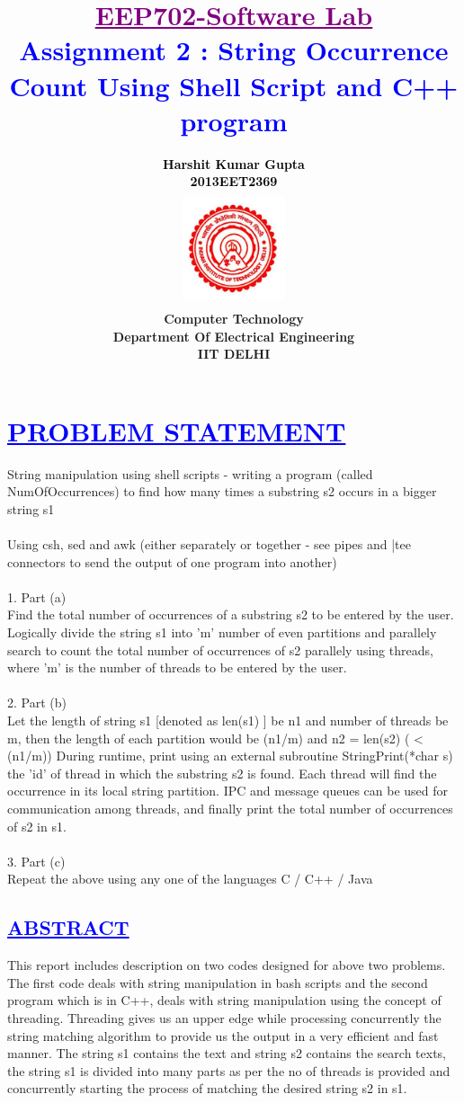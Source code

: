 \documentclass[a4paper,12pt]{report}
\title{\bfseries\huge \textcolor{purple}{\underline {EEP702-Software Lab}} \\{\textcolor{blue}{Assignment 2 : String Occurrence Count  Using Shell Script and C++ program  }}}
\author{\bfseries\large\textcolor{black}  {Harshit Kumar Gupta}\\ {\textcolor{black} {2013EET2369}}\\
\includegraphics[width=3cm,height=3.4cm]{./iit.png}\\\noindent Computer Technology\\
\noindent Department Of Electrical Engineering\\IIT DELHI}
\begin{document}
\maketitle
\tableofcontents


\chapter{\textcolor{blue}{\underline {PROBLEM STATEMENT}}}
\noindent String manipulation using shell scripts - writing a program (called NumOfOccurrences) to find how many 
times a substring s2 occurs in a bigger string s1\\\\
Using csh, sed and awk (either separately or together - see pipes and |tee connectors to send the output of one program into another)\\\\
1. Part (a)\\Find the total number of occurrences of a substring s2 to be entered by the user. Logically divide the string s1 into 'm' number of even partitions and parallely search to count the total number of 
occurrences of s2 parallely using threads, where 'm' is the number of threads to be entered by the user.\\\\
2. Part (b)\\
Let the length of string s1 [denoted as len(s1) ] be n1 and number of threads be m, then the length of each partition would be (n1/m) and n2 = len(s2) ( < (n1/m)) During runtime, print using an external subroutine StringPrint(*char s) the 'id' of thread in which the substring s2 is found. Each thread will find the occurrence in its local string partition. IPC and message 
queues can be used for communication among threads, and finally print the total number of occurrences of s2 in s1.\\\\
3. Part (c)\\
Repeat the above using any one of the languages C / C++ / Java
\begin{center}
\chapter{\textcolor{blue}{\underline {ABSTRACT}}}
\end{center}
\noindent This report includes description on two codes designed for above two problems. The first code deals with string manipulation in bash scripts
 and the second program which is in C++, deals with string manipulation using the concept of threading. Threading gives us an
 upper edge while processing concurrently the string matching algorithm to provide us the output in a very efficient and fast manner.
 The string s1 contains the text and string s2 contains the search texts, the string s1 is divided into many parts as per the no of threads is provided
 and concurrently starting the process of matching the desired string s2 in s1.
\end{document}
